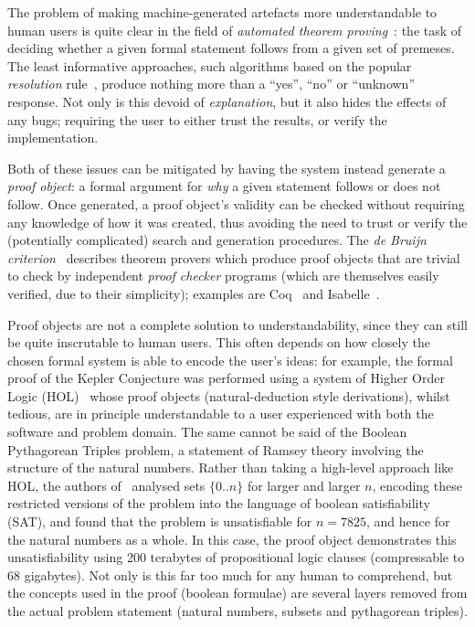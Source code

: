 \documentclass{article}
\begin{document}
The problem of making machine-generated artefacts more understandable to human
users is quite clear in the field of \emph{automated theorem
  proving}~\cite{sutcliffe2001evaluating}: the task of deciding whether a given
formal statement follows from a given set of premeses.  The least informative
approaches, such algorithms based on the popular \emph{resolution}
rule~\cite{robinson1965machine}, produce nothing more than a ``yes'', ``no'' or
``unknown'' response. Not only is this devoid of \emph{explanation}, but it also
hides the effects of any bugs; requiring the user to either trust the results,
or verify the implementation.

Both of these issues can be mitigated by having the system instead generate a
\emph{proof object}: a formal argument for \emph{why} a given statement follows
or does not follow. Once generated, a proof object's validity can be checked
without requiring any knowledge of how it was created, thus avoiding the need to
trust or verify the (potentially complicated) search and generation
procedures. The \emph{de Bruijn criterion}~\cite{barendregt2005challenge}
describes theorem provers which produce proof objects that are trivial to check
by independent \emph{proof checker} programs (which are themselves easily
verified, due to their simplicity); examples are Coq~\cite{barras1997coq} and
Isabelle~\cite{nipkow2002isabelle}.

Proof objects are not a complete solution to understandability, since they can
still be quite inscrutable to human users. This often depends on how closely the
chosen formal system is able to encode the user's ideas: for example, the formal
proof of the Kepler Conjecture was performed using a system of Higher Order
Logic (HOL)~\cite{hales2015formal} whose proof objects (natural-deduction style
derivations), whilst tedious, are in principle understandable to a user
experienced with both the software and problem domain. The same cannot be said
of the Boolean Pythagorean Triples problem, a statement of Ramsey theory
involving the structure of the natural numbers. Rather than taking a high-level
approach like HOL, the authors of~\cite{heule2016solving} analysed sets
$\{0..n\}$ for larger and larger $n$, encoding these restricted versions of the
problem into the language of boolean satisfiability (SAT), and found that the
problem is unsatisfiable for $n= 7825$, and hence for the natural numbers as a
whole. In this case, the proof object demonstrates this unsatisfiability using
200 terabytes of propositional logic clauses (compressable to 68 gigabytes).
Not only is this far too much for any human to comprehend, but the concepts used
in the proof (boolean formulae) are several layers removed from the actual
problem statement (natural numbers, subsets and pythagorean triples).
\end{document}
